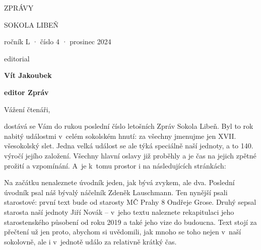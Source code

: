 \documentclass[11pt]{article}
\begin{document}
\pagecolor{sokolred}
\color{white}
\begin{center}

\vspace*{\fill}


{\titlesize \fugner ZPRÁVY}

{\titlesize \tyrs SOKOLA LIBEŇ}

\vspace*{1cm}

{\large ročník L · číslo 4 · prosinec 2024}

\vspace*{\fill}
\end{center}

\clearpage
\normalcolor
\nopagecolor
{}

\pagestyle{uvodnik}



\begin{multicols}{2}
  {\fontsize{48pt}{57pt} \fugner \color{sokolred} \noindent editorial}

  \columnbreak

  \vspace*{-4pt}

  {\hfill\textbf{Vít Jakoubek}}

  {\hfill\textbf{ editor Zpráv }}
\end{multicols}

\vspace*{12pt}

\noindent
Vážení čtenáři, 

\noindent
dostává se Vám do rukou poslední číslo letošních Zpráv Sokola Libeň. Byl to rok nabitý událostmi v~celém sokolském hnutí: za všechny jmenujme jen XVII. všesokolský slet. Jedna velká událost se ale týká speciálně naší jednoty, a to 140. výročí jejího založení.  Všechny hlavní oslavy již proběhly a je čas na jejich zpětné prožití a vzpomínání. A~je k~tomu prostor i na následujících stránkách: 

Na začátku nenaleznete úvodník jeden, jak bývá zvykem, ale dva. Poslední úvodník psal náš bývalý náčelník Zdeněk Lauschmann. Ten nynější psali starostové: první text bude od starosty MČ Prahy 8 Ondřeje Grose. Druhý sepsal starosta naší jednoty Jiří Novák – v~jeho textu naleznete rekapitulaci jeho starostenského působení od roku 2019 a také jeho vize do budoucna. Text stojí za přečtení už jen proto, abychom si uvědomili, jak mnoho se toho nejen v~naší sokolovně, ale i v~jednotě událo za relativně krátký čas. 
\end{document}
